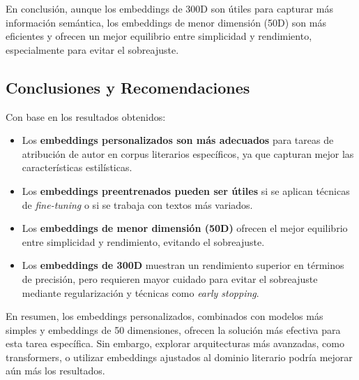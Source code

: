 \documentclass[11pt,english]{article}
\theoremstyle{plain}
\begin{document}
En conclusión, aunque los embeddings de 300D son útiles para capturar más información semántica, los embeddings de menor dimensión (50D) son más eficientes y ofrecen un mejor equilibrio entre simplicidad y rendimiento, especialmente para evitar el sobreajuste.

\subsection*{Conclusiones y Recomendaciones}

Con base en los resultados obtenidos:

\begin{itemize}
    \item Los \textbf{embeddings personalizados son más adecuados} para tareas de atribución de autor en corpus literarios específicos, ya que capturan mejor las características estilísticas.
    \item Los \textbf{embeddings preentrenados pueden ser útiles} si se aplican técnicas de \textit{fine-tuning} o si se trabaja con textos más variados.
    \item Los \textbf{embeddings de menor dimensión (50D)} ofrecen el mejor equilibrio entre simplicidad y rendimiento, evitando el sobreajuste.
    \item Los \textbf{embeddings de 300D} muestran un rendimiento superior en términos de precisión, pero requieren mayor cuidado para evitar el sobreajuste mediante regularización y técnicas como \textit{early stopping}.
\end{itemize}

En resumen, los embeddings personalizados, combinados con modelos más simples y embeddings de 50 dimensiones, ofrecen la solución más efectiva para esta tarea específica. Sin embargo, explorar arquitecturas más avanzadas, como transformers, o utilizar embeddings ajustados al dominio literario podría mejorar aún más los resultados.
\end{document}
